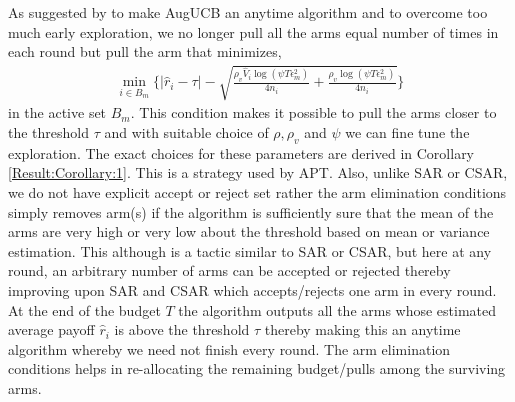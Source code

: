 	As suggested by \cite{liu2016modification} to make AugUCB an anytime algorithm and to overcome too much early exploration, we no longer pull all the arms equal number of times in each round but pull the arm that minimizes,  
\begin{align*}
\min_{i\in B_{m}}\bigg\lbrace |\hat{r}_{i} - \tau | - \sqrt{\frac{\rho_v \hat{V}_{i} \log (\psi T \epsilon_{m}^{2})}{4 n_{i}} + \frac{\rho_v \log{(\psi T\epsilon_{m}^{2})}}{4 n_{i}}} \bigg\rbrace
\end{align*}
in the active set $B_{m}$. This condition makes it possible to pull the arms closer to the threshold $\tau$ and with suitable choice of $\rho,\rho_v$ and $\psi$ we can fine tune the exploration. The exact choices for these parameters are derived in Corollary \ref{Result:Corollary:1}. This is a strategy used by APT. Also, unlike SAR or CSAR, we do not have explicit accept or reject set rather the arm elimination conditions simply removes arm(s) if the algorithm is sufficiently sure that the mean of the arms are very high or very low about the threshold based on mean or variance estimation. This although is a tactic similar to SAR or CSAR, but here at any round, an arbitrary number of arms can be accepted or rejected thereby improving upon SAR and CSAR which accepts/rejects one arm in every round. At the end of the budget $T$ the algorithm outputs all the arms whose estimated average payoff $\hat{r}_{i}$ is above the threshold $\tau$ thereby making this an anytime algorithm whereby we need not finish every round. The arm elimination conditions helps in re-allocating the remaining budget/pulls among the surviving arms.

